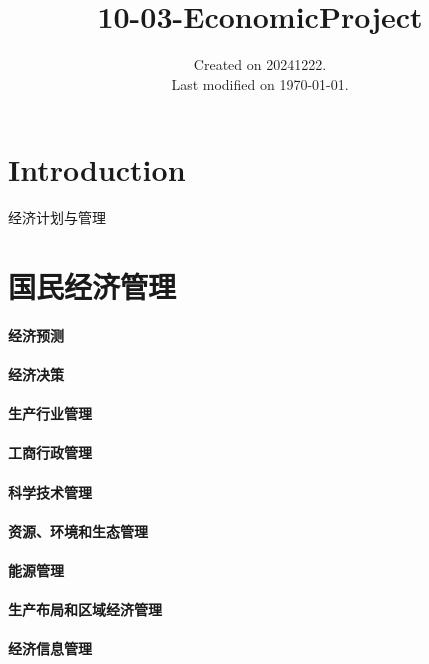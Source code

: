 \documentclass[UTF8]{../../RepresentationUniverse}
\begin{document}
\title{10-03-EconomicProject}
\date{Created on 20241222.\\   Last modified on \today.}
\maketitle
\tableofcontents


\chapter{Introduction}

经济计划与管理


\chapter{国民经济管理}
\subsubsection{经济预测}
\subsubsection{经济决策}
\subsubsection{生产行业管理}
\subsubsection{工商行政管理}
\subsubsection{科学技术管理}
\subsubsection{资源、环境和生态管理}
\subsubsection{能源管理}
\subsubsection{生产布局和区域经济管理}
\subsubsection{经济信息管理}
\end{document}
